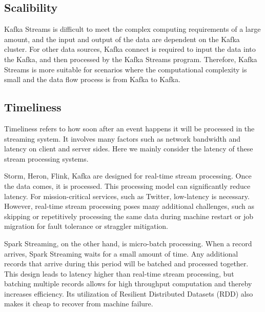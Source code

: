 \documentclass[pdftex,twocolumn,10pt,letterpaper]{article}
\begin{document}
\subsection{Scalibility}


Kafka Streams is difficult to meet the complex computing requirements of a large amount, and the input and output of the data are dependent on the Kafka cluster. For other data sources, Kafka connect is required to input the data into the Kafka, and then processed by the Kafka Streams program. Therefore, Kafka Streams is more suitable for scenarios where the computational complexity is small and the data flow process is from Kafka to Kafka.

\subsection{Timeliness}
Timeliness refers to how soon after an event happens it will be processed in the streaming system. It involves many factors such as network bandwidth and latency on client and server sides. Here we mainly consider the latency of these stream processing systems. 

Storm, Heron, Flink, Kafka are designed for real-time stream processing. Once the data comes, it is processed. This processing model can significantly reduce latency. For mission-critical services, such as Twitter, low-latency is necessary. However, real-time stream processing poses many additional challenges, such as skipping or repetitively processing the same data during machine restart or job migration for fault tolerance or straggler mitigation. 

Spark Streaming, on the other hand, is micro-batch processing. When a record arrives, Spark Streaming waits for a small amount of time. Any additional records that arrive during this period will be batched and processed together. This design leads to latency higher than real-time stream processing, but batching multiple records allows for high throughput computation and thereby increases efficiency. Its utilization of Resilient Distributed Datasets (RDD)\cite{rdd} also makes it cheap to recover from machine failure. 
\end{document}
